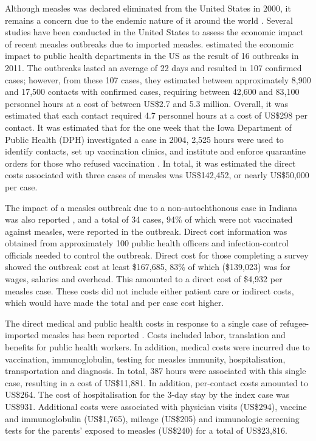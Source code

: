 \documentclass{article}
\begin{document}
Although measles was declared eliminated from the United States in 2000, it remains a concern due to the endemic nature of it around the world \citep{parker6}. Several studies have been conducted in the United States to assess the economic impact of recent measles outbreaks due to imported measles.  \citep{ortegasanchez14} estimated the economic impact to public health departments in the US as the result of 16 outbreaks in 2011. The outbreaks lasted an average of 22 days and resulted in 107 confirmed cases; however, from these 107 cases, they estimated between approximately 8,900 and 17,500 contacts with confirmed cases, requiring between 42,600 and 83,100 personnel hours at a cost of between US\$2.7 and 5.3 million. Overall, it was estimated that each contact required 4.7 personnel hours at a cost of US\$298 per contact.
It was estimated that for the one week that the Iowa Department of Public Health (DPH) investigated a case in 2004, 2,525 hours were used to identify contacts, set up vaccination clinics, and institute and enforce quarantine orders for those who refused vaccination \citep{dayan5}. In total, it was estimated the direct costs associated with three cases of measles was US\$142,452, or nearly US\$50,000 per case.

The impact of a measles outbreak due to a non-autochthonous case in Indiana was also reported \citep{parker6}, and a total of 34 cases, 94\% of which were not vaccinated against measles, were reported in the outbreak. Direct cost information was obtained from approximately 100 public health officers and infection-control officials needed to control the outbreak. Direct cost for those completing a survey showed the outbreak cost at least \$167,685, 83\% of which (\$139,023) was for wages, salaries and overhead. This amounted to a direct cost of \$4,932 per measles case. These costs did not include either patient care or indirect costs, which would have made the total and per case cost higher.

The direct medical and public health costs in response to a single case of refugee-imported measles has been reported \citep{coleman12}.  Costs included labor, translation and benefits for public health workers. In addition, medical costs were incurred due to vaccination, immunoglobulin, testing for measles immunity, hospitalisation, transportation and diagnosis. In total, 387 hours were associated with this single case, resulting in a cost of US\$11,881. In addition, per-contact costs amounted to US\$264. The cost of hospitalisation for the 3-day stay by the index case was US\$931. Additional costs were associated with physician visits (US\$294), vaccine and immunoglobulin (US\$1,765), mileage (US\$205) and immunologic screening tests for the parents' exposed to measles (US\$240) for a total of US\$23,816.
\end{document}
